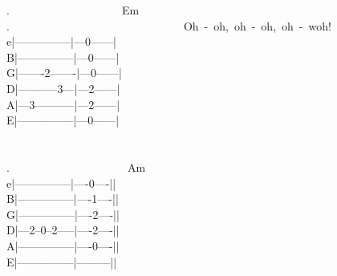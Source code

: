 {.\ \ \ \ \ \ \ \ \ \ \ \ \ \ \ \ \ \ \ \ Em\\
.\ \ \ \ \ \ \ \ \ \ \ \ \ \ \ \ \ \ \ \ \ \ \ \ \ \ \ \ \ \ \ Oh\ -\ oh,\ oh\ -\ oh,\ oh\ -\ woh!\\
e|---------------|---0------|\\
B|---------------|---0------|\\
G|-------2-------|---0------|\\
D|-----------3---|---2------|\\
A|---3-----------|---2------|\\
E|---------------|---0------|\\
\\
\\
.\ \ \ \ \ \ \ \ \ \ \ \ \ \ \ \ \ \ \ \ \ Am\\
e|---------------|----0----||\\
B|---------------|----1----||\\
G|---------------|----2----||\\
D|---2--0--2-----|----2----||\\
A|---------------|----0----||\\
E|---------------|---------||}

